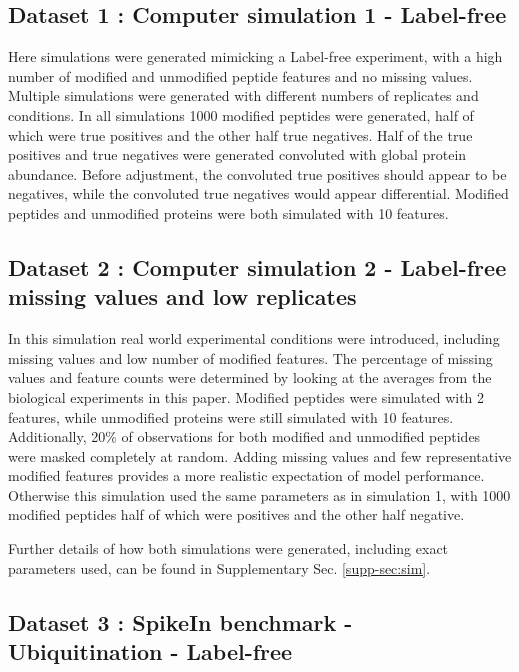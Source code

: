 \documentclass[mcp]{article}
\numberwithin{figure}{section} %
\numberwithin{table}{section}
\begin{document}
\subsection*{Dataset 1 : Computer simulation 1 - Label-free} 
\label{sec:comp_sim_procedure1}

Here simulations were generated mimicking a Label-free experiment, with a high number of modified and unmodified peptide features and no missing values. Multiple simulations were generated with different numbers of replicates and conditions. In all simulations 1000 modified peptides were generated, half of which were true positives and the other half true negatives. Half of the true positives and true negatives were generated convoluted with global protein abundance. Before adjustment, the convoluted true positives should appear to be negatives, while the convoluted true negatives would appear differential. Modified peptides and unmodified proteins were both simulated with 10 features.

\subsection*{Dataset 2 : Computer simulation 2 - Label-free missing values and low replicates} 
\label{sec:comp_sim_procedure2}

In this simulation real world experimental conditions were introduced, including missing values and low number of modified features. The percentage of missing values and feature counts were determined by looking at the averages from the biological experiments in this paper. Modified peptides were simulated with 2 features, while unmodified proteins were still simulated with 10 features. Additionally, 20\% of observations for both modified and unmodified peptides were masked completely at random. Adding missing values and few representative modified features provides a more realistic expectation of model performance. Otherwise this simulation used the same parameters as in simulation 1, with 1000 modified peptides half of which were positives and the other half negative.

Further details of how both simulations were generated, including exact parameters used, can be found in Supplementary Sec. \ref{supp-sec:sim}.
 
\subsection*{Dataset 3 : SpikeIn benchmark - Ubiquitination - Label-free}
\end{document}
